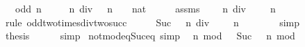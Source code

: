 \begin{isabellebody}
\ \ \ {\isachardoublequoteopen}odd\ n{\isachardoublequoteclose}\isanewline
\ \ \ {\isachardoublequoteopen}{}\ {\isacharasterisk}{\kern0pt}\ {\isacharparenleft}{\kern0pt}n\ div\ {}{\isacharparenright}{\kern0pt}\ {\isacharequal}{\kern0pt}\ n\ {\isacharminus}{\kern0pt}\ {\isacharparenleft}{\kern0pt}{}\ {\isacharcolon}{\kern0pt}{\isacharcolon}{\kern0pt}\ nat{\isacharparenright}{\kern0pt}{\isachardoublequoteclose}\isanewline
%
\isadelimproof
%
\endisadelimproof
%
\isatagproof
{}\isamarkupfalse%
\ {\isacharminus}{\kern0pt}\isanewline
\ \ \isamarkupfalse%
\ assms\ \isamarkupfalse%
\ {\isachardoublequoteopen}{}\ {\isacharasterisk}{\kern0pt}\ {\isacharparenleft}{\kern0pt}n\ div\ {}{\isacharparenright}{\kern0pt}\ {\isacharplus}{\kern0pt}\ {}\ {\isacharequal}{\kern0pt}\ n{\isachardoublequoteclose}\isanewline
\ \ \ \ \isamarkupfalse%
\ {\isacharparenleft}{\kern0pt}rule\ odd{\isacharunderscore}{\kern0pt}two{\isacharunderscore}{\kern0pt}times{\isacharunderscore}{\kern0pt}div{\isacharunderscore}{\kern0pt}two{\isacharunderscore}{\kern0pt}succ{\isacharparenright}{\kern0pt}\isanewline
\ \ \isamarkupfalse%
\ \isamarkupfalse%
\ {\isachardoublequoteopen}Suc\ {\isacharparenleft}{\kern0pt}{}\ {\isacharasterisk}{\kern0pt}\ {\isacharparenleft}{\kern0pt}n\ div\ {}{\isacharparenright}{\kern0pt}{\isacharparenright}{\kern0pt}\ {\isacharminus}{\kern0pt}\ {}\ {\isacharequal}{\kern0pt}\ n\ {\isacharminus}{\kern0pt}\ {}{\isachardoublequoteclose}\isanewline
\ \ \ \ \isamarkupfalse%
\ simp\isanewline
\ \ \isamarkupfalse%
\ \isamarkupfalse%
\ {\isacharquery}{\kern0pt}thesis\isanewline
\ \ \ \ \isamarkupfalse%
\ simp\isanewline
{}\isamarkupfalse%
%
\endisatagproof
{\isafoldproof}%
%
\isadelimproof
\isanewline
%
\endisadelimproof
\isanewline
{}\isamarkupfalse%
\ not{\isacharunderscore}{\kern0pt}mod{}{\isacharunderscore}{\kern0pt}eq{\isacharunderscore}{\kern0pt}Suc{\isacharunderscore}{\kern0pt}{}{\isacharunderscore}{\kern0pt}eq{\isacharunderscore}{\kern0pt}{}\ {\isacharbrackleft}{\kern0pt}simp{\isacharbrackright}{\kern0pt}{\isacharcolon}{\kern0pt}\isanewline
\ \ {\isachardoublequoteopen}n\ mod\ {}\ {\isasymnoteq}\ Suc\ {}\ {\isasymlongleftrightarrow}\ n\ mod\ {}\ {\isacharequal}{\kern0pt}\ {}{\isachardoublequoteclose}\isanewline

\end{isabellebody}
